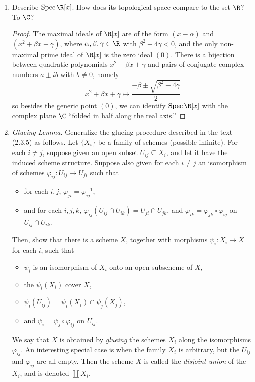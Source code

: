 \documentclass[a4paper]{article}
\begin{document}
\begin{enumerate} [label=\textbf{\arabic*.}, leftmargin=0em]
\item[\textbf{10.}] Describe $\spec{\R[x]}$. How does its topological space compare to the set $\R$? To $\C$?

\begin{proof}
    The maximal ideals of $\R[x]$ are of the form $(x - \alpha)$ and $(x^2 + \beta x + \gamma)$, where $\alpha, \beta, \gamma \in \R$ with $\beta^2 - 4 \gamma < 0$, and the only non-maximal prime ideal of $\R[x]$ is the zero ideal $(0)$. There is a bijection between quadratic polynomials $x^2 + \beta x + \gamma$ and pairs of conjugate complex numbers $a \pm i b$ with $b \neq 0$, namely
    \begin{equation*}
        x^2 + \beta x + \gamma \mapsto \frac{-\beta \pm \sqrt{\beta^2 -4\gamma}}{2} 
    \end{equation*}
    so besides the generic point $(0)$, we can identify $\spec{\R[x]}$ with the complex plane $\C$ ``folded in half along the real axis.''
\end{proof}

\item[\textbf{12.}] \textit{Glueing Lemma.} Generalize the glueing procedure described in the text (2.3.5) as follows. Let $\{X_i\}$ be a family of schemes (possible infinite). For each $i \neq j$, suppose given an open subset $U_{ij} \subseteq X_i$, and let it have the induced scheme structure. Suppose also given for each $i \neq j$ an isomorphism of schemes $\varphi_{ij} : U_{ij} \to U_{ji}$ such that
\begin{itemize}
    \item[(1)] for each $i, j$, $\varphi_{ji} = \varphi_{ij}^{-1}$,
    \item[(2)] and for each $i, j, k$, $\varphi_{ij}(U_{ij} \cap U_{ik}) = U_{ji} \cap U_{jk}$, and $\varphi_{ik} = \varphi_{jk} \circ \varphi_{ij}$ on $U_{ij} \cap U_{ik}$.
\end{itemize}
Then, show that there is a scheme $X$, together with morphisms $\psi_i : X_i \to X$ for each $i$, such that
\begin{itemize}
    \item[(1)] $\psi_i$ is an isomorphism of $X_i$ onto an open subscheme of $X$,
    \item[(2)] the $\psi_i(X_i)$ cover $X$,
    \item[(3)] $\psi_i(U_{ij}) = \psi_i(X_i) \cap \psi_j(X_j)$,
    \item[(4)] and $\psi_i = \psi_j \circ \varphi_{ij}$ on $U_{ij}$.
\end{itemize}
We say that $X$ is obtained by \textit{glueing} the schemes $X_i$ along the isomorphisms $\varphi_{ij}$. An interesting special case is when the family $X_i$ is arbitrary, but the $U_{ij}$ and $\varphi_{ij}$ are all empty. Then the scheme $X$ is called the \textit{disjoint union} of the $X_i$, and is denoted $\coprod X_i$.


\end{enumerate}
\end{document}
